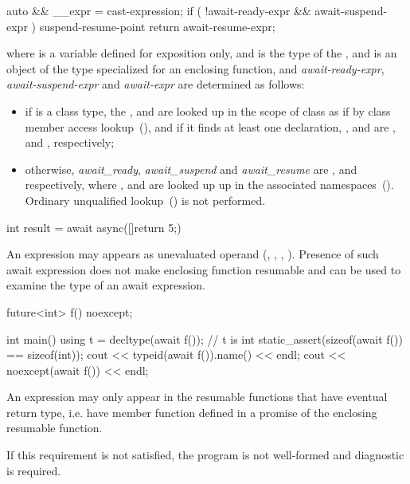 \begin{codeblock}
{
  auto && __expr = cast-expression;
  if ( !await-ready-expr && await-suspend-expr ) {
    suspend-resume-point
  }
  return await-resume-expr;
}
\end{codeblock}

where  is a variable defined for
exposition only, and  is the type of the
, and 
is an object of the  type specialized for an enclosing function,
and \textit{await-ready-expr}, \textit{await-suspend-expr} and \textit{await-expr} are
determined as follows:

\begin{itemize}
	\item if  is a class type, the 
	,  and  are 
	looked up in the scope of class 
	as if by class member access lookup~(), and if it finds at least one declaration, 
	,  and  are
	,  and ,
	respectively;
	
	\item otherwise, \textit{await_ready}, \textit{await_suspend} and \textit{await_resume} are 
	,  and  
	respectively, where 
	,  and  are 
	looked up up in the associated namespaces~().
	\enternote Ordinary unqualified lookup~() is not
	performed. \exitnote
\end{itemize}

\enterexample
\begin{codeblock}
	int result = await async([]{return 5;})
\end{codeblock}
\exitexample%

\pnum
An  expression may appears as unevaluated operand (, , , ). Presence of such await expression does not make enclosing function resumable and can be used to examine the type of an await expression.
 
\enterexample
\begin{codeblock}	
future<int> f() noexcept;
	
int main() {
  using t = decltype(await f()); // t is int
  static_assert(sizeof(await f()) == sizeof(int));
  cout << typeid(await f()).name() << endl;
  cout << noexcept(await f()) << endl;
}
\end{codeblock}
\exitexample%

\pnum
An  expression may only appear in the resumable functions 
that have eventual return type, i.e. have  member
function defined in a promise of the enclosing resumable function.

If this requirement is not satisfied, the program is not well-formed and diagnostic is required.
